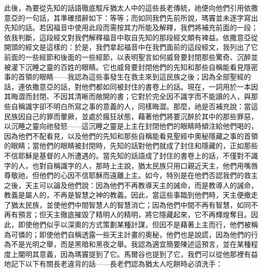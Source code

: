 此後，為要從先知的話語徹底駁斥猶太人中的這些長老傳統，祂便向他們引用依撒意亞的一句話，其準確措辭如下：等等；而如同我們先前所說，瑪竇並未逐字寫出先知的話。若因福音中使用此段而需按其力所能及解釋，我們將補充前面的一段；依我判斷，這段經文對我們解釋福音中取自先知的那段經文頗有裨益。依撒意亞從開頭的經文是這樣的：於是，我們拿起福音中在我們面前的這段經文，我列出了它前面的一些經節和後面的一些經節，以表明聖言如何威脅要封閉那些驚奇、沉醉並被灌下沉睡之靈的百姓的眼睛。它也威脅要封閉他們的先知和那些自稱能看見隱密事的首領的眼睛——我認為這些事發生在救主來到這民族之後；因為全部聖經的話，連依撒意亞的話，對他們都如同被封住的書卷上的話。現在，一詞用於一本因其晦澀而封閉、不因其清晰而敞開的書；它對於完全因不識字而不能讀的人，與那些自稱識字卻不明白所寫之事的意義的人，同樣晦澀。那麼，祂是否補充說：當這民族因自己的罪而暈厥，並處於瘋狂狀態，藉著他們將要沉醉於其中的那些罪惡，以沉睡之靈向祂發怒——這沉睡之靈是上主在封閉他們的眼睛時傾注給他們喝的，因為他們不配看見，以及他們的先知和那些自稱能看見聖經中奧秘隱藏之事的首領的眼睛；當他們的眼睛被封閉時，先知的話對他們就成了封住和隱藏的，正如那些不信耶穌是基督的人所遭遇的。當先知的話語成了封住的書卷上的話，不僅對不識字的人，也對自稱識字的人，那時上主說，猶太民族只用口親近天主，他們用嘴唇尊敬祂，但他們的心因不信耶穌而遠離上主。如今，特別是在他們否認我們的救主之後，天主可以論及他們說：因為他們不再教導天主的誡命，而是教導人的誡命，教義是屬人的，不再是智慧之神的教義。因此，當這些事臨到他們時，天主便撤走了猶太民族，並使他們中間智慧人的智慧消亡；因為他們中間不再有智慧，如同不再有預言；但天主徹底摧毀了精明人的精明，將它隱藏起來，它不再輝煌奪目。因此，即使他們似乎以深奧的方式策劃某種計謀，但因不是藉著上主而行，他們被稱為可憐的；即使他們自稱透露一些天主計畫的奧秘，他們也是說謊，因為他們的行為不是光明之舉，而是黑暗和黑夜之舉。我認為適宜簡要陳述這預言，並在某種程度上闡明其意義，因為瑪竇提到了它。馬爾谷也提到了它，我們可以從他那裡有益地記下以下有關長老違背的話——長老們認為猶太人吃餅時必須洗手：\par

